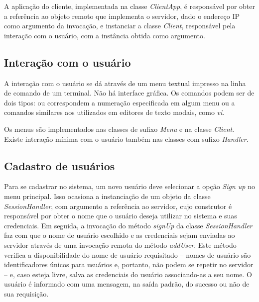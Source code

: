 \documentclass[../main.tex]{subfiles}
\begin{document}
A aplicação do cliente, implementada na classe \textit{ClientApp}, é responsável por obter a referência ao objeto remoto que implementa o servidor, dado o endereço IP como argumento da invocação, e instanciar a classe \textit{Client}, responsável pela interação com o usuário, com a instância obtida como argumento.

\subsection{Interação com o usuário}

A interação com o usuário se dá através de um menu textual impresso na linha de comando de um terminal.
Não há interface gráfica.
Os comandos podem ser de dois tipos: ou correspondem a numeração especificada em algum menu ou a comandos similares aos utilizados em editores de texto modais, como \textit{vi}.

Os menus são implementados nas classes de sufixo \textit{Menu} e na classe \textit{Client}.
Existe interação mínima com o usuário também nas classes com sufixo \textit{Handler}.

\subsection{Cadastro de usuários}

Para se cadastrar no sistema, um novo usuário deve selecionar a opção \textit{Sign up} no menu principal.
Isso ocasiona a instanciação de um objeto da classe \textit{SessionHandler}, com argumento a referência ao servidor, cujo construtor é responsável por obter o nome que o usuário deseja utilizar no sistema e suas credenciais.
Em seguida, a invocação do método \textit{signUp} da classe \textit{SessionHandler} faz com que o nome de usuário escolhido e as credenciais sejam enviadas ao servidor através de uma invocação remota do método \textit{addUser}.
Este método verifica a disponibilidade do nome de usuário requisitado -- nomes de usuário são identificadores únicos para usuários e, portanto, não podem se repetir no servidor -- e, caso esteja livre, salva as credenciais do usuário associando-as a seu nome.
O usuário é informado com uma mensagem, na saída padrão, do sucesso ou não de sua requisição.

\end{document}

